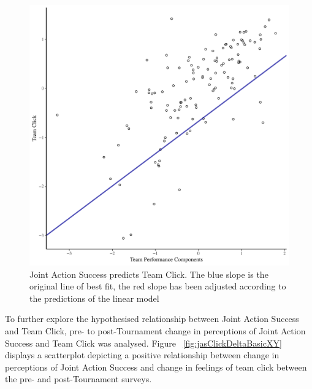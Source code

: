 \begin{landscape}
\begin{figure}[htbp]
\includegraphics[width = \linewidth]{images/jasClickModelSlope}
  \caption{Joint Action Success predicts Team Click. The blue slope is the original line of best fit, the red slope has been adjusted according to the predictions of the linear model}
  \label{fig:jasClickModelSLope}
\end{figure}



To further explore the hypothesised relationship between Joint Action Success and Team Click, pre- to post-Tournament change in perceptions of Joint Action Success and Team Click was analysed.  Figure ~\ref{fig:jasClickDeltaBasicXY} displays a scatterplot depicting a positive relationship between change in perceptions of Joint Action Success and change in feelings of team click between the pre- and post-Tournament surveys.


\end{landscape}
